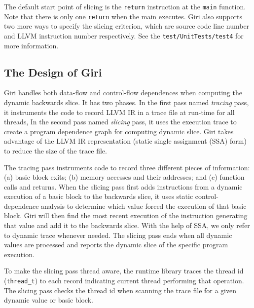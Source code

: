 \documentclass[DIV=calc, paper=a4, fontsize=11pt, twocolumn]{scrartcl}
\begin{document}
The default start point of slicing is the \texttt{return} instruction at the \texttt{main} function.
Note that there is only one \texttt{return} when the main executes.
Giri also supports two more ways to specify the slicing criterion, which are source code line number and LLVM instruction number respectively.
See the \texttt{test/UnitTests/test4} for more information.

\subsection{The Design of Giri}
Giri handles both data-flow and control-flow dependences when computing the dynamic backwards slice. 
It has two phases.
In the first pass named \emph{tracing} pass, it instruments the code to record LLVM IR in a trace file at run-time for all threads,
In the second pass named \emph{slicing} pass, it uses the execution trace to create a program dependence graph for computing dynamic slice.
Giri takes advantage of the LLVM IR representation (static single assignment (SSA) form) to reduce the size of the trace file. 

The tracing pass instruments code to record three different pieces of information:
(a) basic block exits; (b) memory accesses and their addresses; and (c) function calls and returns.
When the slicing pass first adds instructions from a dynamic execution of a basic block to the backwards slice,
it uses static control-dependence analysis to determine which value forced the execution of that basic block.
Giri will then find the most recent execution of the instruction generating that value and add it to the backwards slice.
With the help of SSA, we only refer to dynamic trace whenever needed.
The slicing pass ends when all dynamic values are processed and reports the dynamic slice of the specific program execution.

To make the slicing pass thread aware,
the runtime library traces the thread id (\texttt{thread\_t}) to each record indicating current thread performing that operation.
The slicing pass checks the thread id when scanning the trace file for a given dynamic value or basic block.

\end{document}
